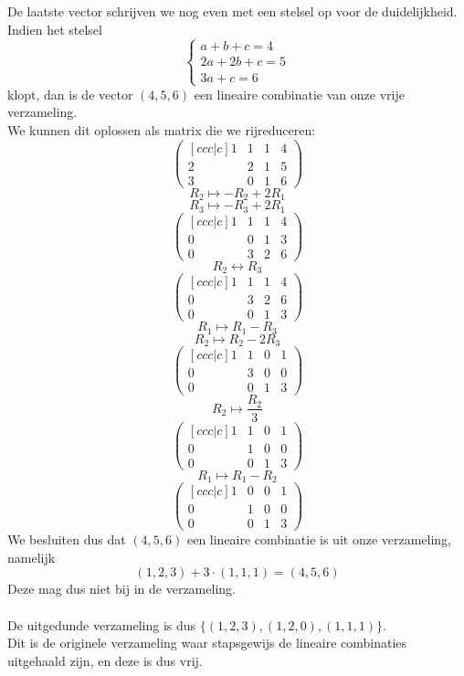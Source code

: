 \documentclass[lineaire_algebra_oplossingen.tex]{subfiles}
\begin{document}
De laatste vector schrijven we nog even met een stelsel op voor de duidelijkheid. Indien het stelsel
\[
\left\{
\begin{array}{l}
a + b + c = 4\\
2a + 2b + c = 5\\
3a + c = 6
\end{array} \right.
\]
klopt, dan is de vector $(4,5,6)$ een lineaire combinatie van onze vrije verzameling.\\
We kunnen dit oplossen als matrix die we rijreduceren:
\[
\begin{pmatrix}[ccc|c]
1 & 1 & 1 & 4\\
2 & 2 & 1 & 5\\
3 & 0 & 1 & 6
\end{pmatrix}
\]
\[R_2 \mapsto -R_2 + 2R_1 \]
\[R_3 \mapsto -R_3 + 2R_1 \]
\[
\begin{pmatrix}[ccc|c]
1 & 1 & 1 & 4\\
0 & 0 & 1 & 3\\
0 & 3 & 2 & 6
\end{pmatrix}
\]
\[R_2 \leftrightarrow R_3\]
\[
\begin{pmatrix}[ccc|c]
1 & 1 & 1 & 4\\
0 & 3 & 2 & 6\\
0 & 0 & 1 & 3
\end{pmatrix}
\]
\[R_1 \mapsto R_1 - R_3 \]
\[R_2 \mapsto R_2 - 2R_3 \]
\[
\begin{pmatrix}[ccc|c]
1 & 1 & 0 & 1\\
0 & 3 & 0 & 0\\
0 & 0 & 1 & 3
\end{pmatrix}
\]
\[R_2 \mapsto \frac{R_2}{3}\]
\[
\begin{pmatrix}[ccc|c]
1 & 1 & 0 & 1\\
0 & 1 & 0 & 0\\
0 & 0 & 1 & 3
\end{pmatrix}
\]
\[R_1 \mapsto R_1 - R_2\]
\[
\begin{pmatrix}[ccc|c]
1 & 0 & 0 & 1\\
0 & 1 & 0 & 0\\
0 & 0 & 1 & 3
\end{pmatrix}
\]
We besluiten dus dat $(4,5,6)$ een lineaire combinatie is uit onze verzameling, namelijk
\[
(1,2,3) + 3 \cdot (1,1,1) = (4,5,6)
\]
Deze mag dus niet bij in de verzameling.\\\\
De uitgedunde verzameling is dus $\{(1,2,3), (1,2,0), (1,1,1)\}$.\\
Dit is de originele verzameling waar stapsgewijs de lineaire combinaties uitgehaald zijn, en deze is dus vrij.
\end{document}

